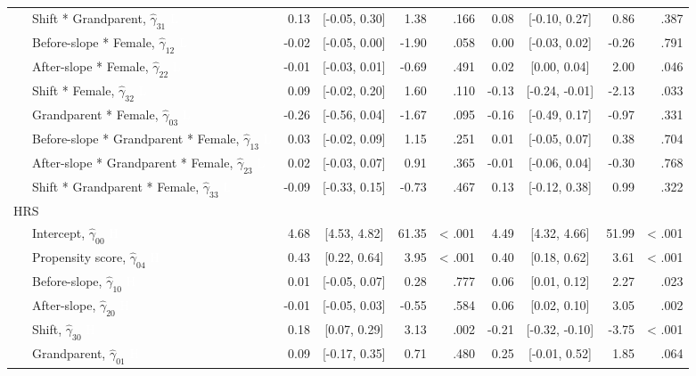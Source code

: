 \documentclass[
  english,
  man, noextraspace,floatsintext]{apa7}
\newenvironment{lltable}{\begin{landscape}\begin{center}\begin{ThreePartTable}}{\end{ThreePartTable}\end{center}\end{landscape}}
\begin{document}
\begin{appendix}
\begin{lltable}
{\begin{longtable}{lrcrrrcrr}
\ \ \ Shift * Grandparent, $\hat{\gamma}_{31}$ \textcolor{white}{L} & 0.13 & {}[-0.05, 0.30] & 1.38 & .166 & 0.08 & {}[-0.10, 0.27] & 0.86 & .387\\
\ \ \ Before-slope * Female, $\hat{\gamma}_{12}$ \textcolor{white}{L} & -0.02 & {}[-0.05, 0.00] & -1.90 & .058 & 0.00 & {}[-0.03, 0.02] & -0.26 & .791\\
\ \ \ After-slope * Female, $\hat{\gamma}_{22}$ \textcolor{white}{L} & -0.01 & {}[-0.03, 0.01] & -0.69 & .491 & 0.02 & {}[0.00, 0.04] & 2.00 & .046\\
\ \ \ Shift * Female, $\hat{\gamma}_{32}$ \textcolor{white}{L} & 0.09 & {}[-0.02, 0.20] & 1.60 & .110 & -0.13 & {}[-0.24, -0.01] & -2.13 & .033\\
\ \ \ Grandparent * Female, $\hat{\gamma}_{03}$ \textcolor{white}{L} & -0.26 & {}[-0.56, 0.04] & -1.67 & .095 & -0.16 & {}[-0.49, 0.17] & -0.97 & .331\\
\ \ \ Before-slope * Grandparent * Female, $\hat{\gamma}_{13}$ \textcolor{white}{L} & 0.03 & {}[-0.02, 0.09] & 1.15 & .251 & 0.01 & {}[-0.05, 0.07] & 0.38 & .704\\
\ \ \ After-slope * Grandparent * Female, $\hat{\gamma}_{23}$ \textcolor{white}{L} & 0.02 & {}[-0.03, 0.07] & 0.91 & .365 & -0.01 & {}[-0.06, 0.04] & -0.30 & .768\\
\ \ \ Shift * Grandparent * Female, $\hat{\gamma}_{33}$ \textcolor{white}{L} & -0.09 & {}[-0.33, 0.15] & -0.73 & .467 & 0.13 & {}[-0.12, 0.38] & 0.99 & .322\\
HRS &  &  &  &  &  &  &  & \\
\ \ \ Intercept, $\hat{\gamma}_{00}$ \textcolor{white}{H} & 4.68 & {}[4.53, 4.82] & 61.35 & < .001 & 4.49 & {}[4.32, 4.66] & 51.99 & < .001\\
\ \ \ Propensity score, $\hat{\gamma}_{04}$ \textcolor{white}{H} & 0.43 & {}[0.22, 0.64] & 3.95 & < .001 & 0.40 & {}[0.18, 0.62] & 3.61 & < .001\\
\ \ \ Before-slope, $\hat{\gamma}_{10}$ \textcolor{white}{H} & 0.01 & {}[-0.05, 0.07] & 0.28 & .777 & 0.06 & {}[0.01, 0.12] & 2.27 & .023\\
\ \ \ After-slope, $\hat{\gamma}_{20}$ \textcolor{white}{H} & -0.01 & {}[-0.05, 0.03] & -0.55 & .584 & 0.06 & {}[0.02, 0.10] & 3.05 & .002\\
\ \ \ Shift, $\hat{\gamma}_{30}$ \textcolor{white}{H} & 0.18 & {}[0.07, 0.29] & 3.13 & .002 & -0.21 & {}[-0.32, -0.10] & -3.75 & < .001\\
\ \ \ Grandparent, $\hat{\gamma}_{01}$ \textcolor{white}{H} & 0.09 & {}[-0.17, 0.35] & 0.71 & .480 & 0.25 & {}[-0.01, 0.52] & 1.85 & .064\\

\end{longtable}}
\end{lltable}
\end{appendix}
\end{document}
